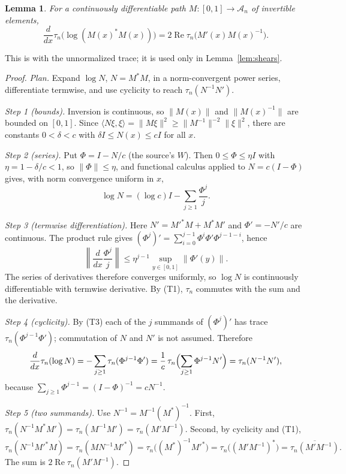 \documentclass[11pt]{article}
\newtheorem{lemma}[theorem]{Lemma}
\theoremstyle{remark}
\numberwithin{equation}{section}
\begin{document}
\begin{lemma}\label{lem:logderivative}
For a continuously differentiable path $M:[0,1]\to\mathcal A_n$ of invertible elements,
\[
 \frac{d}{dx}\tau_n\bigl(\log(M(x)^*M(x))\bigr)
 =2\operatorname{Re}\tau_n\bigl(M'(x)M(x)^{-1}\bigr).
\]
\end{lemma}

This is \cite[Lemma 2]{FK1952} with the unnormalized trace; it is used only in Lemma~\ref{lem:shears}.

\begin{proof}
\emph{Plan.} Expand $\log N$, $N=M^*M$, in a norm-convergent power series, differentiate termwise, and use cyclicity to reach $\tau_n(N^{-1}N')$.

\emph{Step 1 (bounds).} Inversion is continuous, so $\|M(x)\|$ and $\|M(x)^{-1}\|$ are bounded on $[0,1]$. Since $\langle N\xi,\xi\rangle=\|M\xi\|^2\ge\|M^{-1}\|^{-2}\|\xi\|^2$, there are constants $0<\delta<c$ with $\delta I\le N(x)\le cI$ for all $x$.

\emph{Step 2 (series).} Put $\Phi=I-N/c$ (the source's $W$). Then $0\le\Phi\le\eta I$ with $\eta=1-\delta/c<1$, so $\|\Phi\|\le\eta$, and functional calculus applied to $N=c(I-\Phi)$ gives, with norm convergence uniform in $x$,
\[
 \log N=(\log c)I-\sum_{j\ge1}\frac{\Phi^j}{j}.
\]

\emph{Step 3 (termwise differentiation).} Here $N'=M'^*M+M^*M'$ and $\Phi'=-N'/c$ are continuous. The product rule gives $(\Phi^j)'=\sum_{i=0}^{j-1}\Phi^i\Phi'\Phi^{j-1-i}$, hence
\[
 \left\|\frac{d}{dx}\frac{\Phi^j}{j}\right\|\le\eta^{j-1}\sup_{y\in[0,1]}\|\Phi'(y)\|.
\]
The series of derivatives therefore converges uniformly, so $\log N$ is continuously differentiable with termwise derivative. By (T1), $\tau_n$ commutes with the sum and the derivative.

\emph{Step 4 (cyclicity).} By (T3) each of the $j$ summands of $(\Phi^j)'$ has trace $\tau_n(\Phi^{j-1}\Phi')$; commutation of $N$ and $N'$ is not assumed. Therefore
\[
 \frac{d}{dx}\tau_n(\log N)=-\sum_{j\ge1}\tau_n(\Phi^{j-1}\Phi')
 =\frac1c\,\tau_n\Bigl(\sum_{j\ge1}\Phi^{j-1}N'\Bigr)=\tau_n(N^{-1}N'),
\]
because $\sum_{j\ge1}\Phi^{j-1}=(I-\Phi)^{-1}=cN^{-1}$.

\emph{Step 5 (two summands).} Use $N^{-1}=M^{-1}(M^*)^{-1}$. First, $\tau_n(N^{-1}M^*M')=\tau_n(M^{-1}M')=\tau_n(M'M^{-1})$. Second, by cyclicity and (T1),
\[
 \tau_n(N^{-1}M'^*M)=\tau_n(MN^{-1}M'^*)=\tau_n\bigl((M^*)^{-1}M'^*\bigr)
 =\tau_n\bigl((M'M^{-1})^*\bigr)=\overline{\tau_n(M'M^{-1})}.
\]
The sum is $2\operatorname{Re}\tau_n(M'M^{-1})$.
\end{proof}
\end{document}

